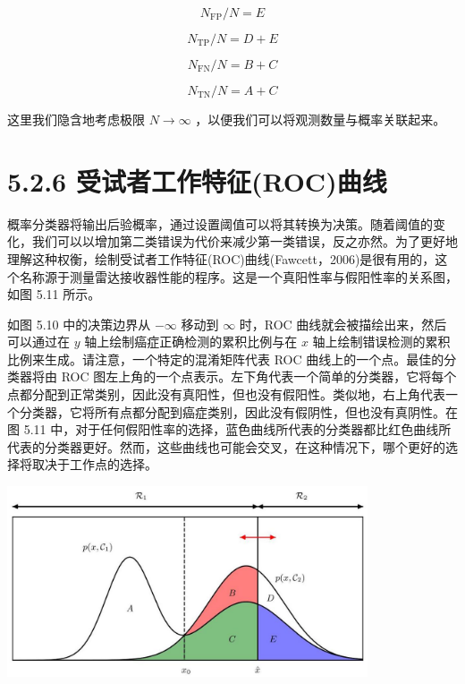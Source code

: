 \documentclass[10pt]{article}
\begin{document}
\[
{N}_{\mathrm{{FP}}}/N = E \tag{5.34}
\]

\[
{N}_{\mathrm{{TP}}}/N = D + E \tag{5.35}
\]

\[
{N}_{\mathrm{{FN}}}/N = B + C \tag{5.36}
\]

\[
{N}_{\mathrm{{TN}}}/N = A + C \tag{5.37}
\]

这里我们隐含地考虑极限 \(N \rightarrow  \infty\) ，以便我们可以将观测数量与概率关联起来。

\section*{5.2.6 受试者工作特征(ROC)曲线}

概率分类器将输出后验概率，通过设置阈值可以将其转换为决策。随着阈值的变化，我们可以以增加第二类错误为代价来减少第一类错误，反之亦然。为了更好地理解这种权衡，绘制受试者工作特征(ROC)曲线(Fawcett，2006)是很有用的，这个名称源于测量雷达接收器性能的程序。这是一个真阳性率与假阳性率的关系图，如图 5.11 所示。

如图 5.10 中的决策边界从 \(- \infty\) 移动到 \(\infty\) 时，ROC 曲线就会被描绘出来，然后可以通过在 \(y\) 轴上绘制癌症正确检测的累积比例与在 \(x\) 轴上绘制错误检测的累积比例来生成。请注意，一个特定的混淆矩阵代表 ROC 曲线上的一个点。最佳的分类器将由 ROC 图左上角的一个点表示。左下角代表一个简单的分类器，它将每个点都分配到正常类别，因此没有真阳性，但也没有假阳性。类似地，右上角代表一个分类器，它将所有点都分配到癌症类别，因此没有假阴性，但也没有真阴性。在图 5.11 中，对于任何假阳性率的选择，蓝色曲线所代表的分类器都比红色曲线所代表的分类器更好。然而，这些曲线也可能会交叉，在这种情况下，哪个更好的选择将取决于工作点的选择。

\begin{center}
\includegraphics[max width=0.8\textwidth]{images/0194e279-9b28-703a-88f4-c3ac21e2010d_168_348_341_1099_580_0.jpg}
\end{center}
\hspace*{3em} 
\end{document}

